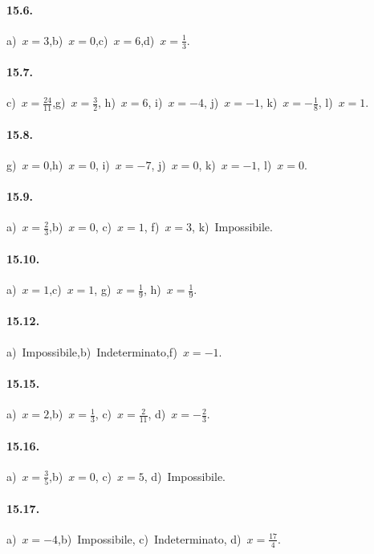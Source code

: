 \paragraph{15.6.}
a)~$x=3$,\quad b)~$x=0$,\quad c)~$x=6$,\quad d)~$x=\frac{1}{3}$.

\paragraph{15.7.}
c)~$x=\frac{24}{11}$,\quad g)~$x=\frac{3}{2}$, \quad h)~$x=6$, \quad i)~$x=-4$, \quad j)~$x=-1$, \quad k)~$x=-\frac{1}{8}$, \quad l)~$x=1$.

\paragraph{15.8.}
g)~$x=0$,\quad h)~$x=0$, \quad i)~$x=-7$, \quad j)~$x=0$, \quad k)~$x=-1$, \quad l)~$x=0$.

\paragraph{15.9.}
a)~$x=\frac{2}{3}$,\quad b)~$x=0$, \quad c)~$x=1$, \quad f)~$x=3$, \quad k)~Impossibile.

\paragraph{15.10.}
a)~$x=1$,\quad c)~$x=1$, \quad g)~$x=\frac{1}{9}$, \quad h)~$x=\frac{1}{9}$.

\paragraph{15.12.}
a)~Impossibile,\quad b)~Indeterminato,\quad f)~$x=-1$.

\paragraph{15.15.}
a)~$x=2$,\quad b)~$x=\frac{1}{3}$, \quad c)~$x=\frac{2}{11}$, \quad d)~$x=-\frac{2}{3}$.

\paragraph{15.16.}
a)~$x=\frac{3}{5}$,\quad b)~$x=0$, \quad c)~$x=5$, \quad d)~Impossibile.

\paragraph{15.17.}
a)~$x=-4$,\quad b)~Impossibile, \quad c)~Indeterminato, \quad d)~$x=\frac{17}{4}$.

